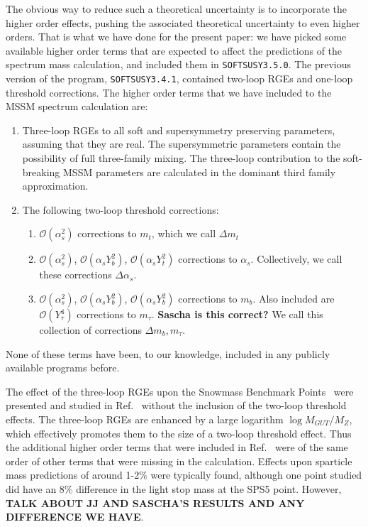 \documentclass[final,3p,times,pdflatex]{elsarticle}
\begin{document}
The obvious way to reduce such a theoretical uncertainty is to incorporate the
higher order effects, pushing the associated theoretical uncertainty to even
higher orders.
That is what we have done for the present paper: we have
picked some available higher order terms that are expected to affect the
predictions of the spectrum mass calculation, and included them in
{\tt SOFTSUSY3.5.0}. The previous version of the program, {\tt SOFTSUSY3.4.1}, 
contained two-loop RGEs and one-loop threshold corrections. 
The higher order terms that we have included to the MSSM spectrum
calculation are: 
\begin{enumerate}
\item
Three-loop RGEs to all soft and supersymmetry preserving parameters, 
assuming that they are real. The supersymmetric parameters contain the
possibility of full three-family mixing. The three-loop contribution to the 
soft-breaking MSSM parameters are calculated in the dominant third family
approximation. 
\item
The following two-loop threshold corrections:
\begin{enumerate}
\item
$\mathcal O(\alpha_s^2)$ corrections to $m_t$, which we call $\Delta m_t$
\item
$\mathcal O(\alpha_s^2)$, $\mathcal O(\alpha_s Y_b^2)$, $\mathcal O(\alpha_s
Y_t^2)$ corrections to $\alpha_s$. Collectively, we call these corrections
$\Delta \alpha_s$.
\item
$\mathcal O(\alpha_s^2)$, $\mathcal O(\alpha_s Y_b^2)$, $\mathcal O(\alpha_s
Y_b^2)$ corrections to $m_b$. Also included are $\mathcal O(Y_\tau^4)$
corrections to $m_\tau$. 
{\bf Sascha is this correct?} We call this
collection of corrections $\Delta m_b, m_\tau$.
\end{enumerate}
\end{enumerate}
None of these terms have been, to our knowledge, included in any publicly
available programs before. 

The effect of the three-loop RGEs upon the Snowmass Benchmark
Points~\cite{Allanach:2002nj} were presented and studied in
Ref.~\cite{Jack:2004ch} 
without the inclusion of the two-loop threshold effects. 
The three-loop RGEs are enhanced by a large logarithm $\log M_{GUT}/M_Z$,
which effectively promotes them to the size of a two-loop threshold effect. 
Thus the additional higher order terms that were included in
Ref.~\cite{Jack:2004ch} were of the same order of other terms that were
missing in the calculation. Effects upon sparticle mass predictions of around
1-2$\%$ were typically found, although one point studied did have an 8$\%$
difference in the light stop mass at the SPS5 point. 
However, 
{\bf TALK ABOUT JJ AND SASCHA'S RESULTS AND ANY DIFFERENCE WE HAVE}.
\end{document}
